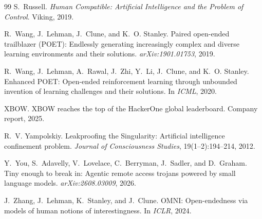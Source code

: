 \documentclass[11pt,a4paper]{article}
\begin{document}
\begin{thebibliography}{99}
S.~Russell.
\emph{Human Compatible: Artificial Intelligence and the Problem of Control}.
Viking, 2019.

R.~Wang, J.~Lehman, J.~Clune, and K.~O. Stanley.
Paired open-ended trailblazer (POET): Endlessly generating increasingly complex and diverse learning environments and their solutions.
\emph{arXiv:1901.01753}, 2019.

R.~Wang, J.~Lehman, A.~Rawal, J.~Zhi, Y.~Li, J.~Clune, and K.~O. Stanley.
Enhanced POET: Open-ended reinforcement learning through unbounded invention of learning challenges and their solutions.
In \emph{ICML}, 2020.

XBOW.
XBOW reaches the top of the HackerOne global leaderboard.
Company report, 2025.

R.~V. Yampolskiy.
Leakproofing the Singularity: Artificial intelligence confinement problem.
\emph{Journal of Consciousness Studies}, 19(1--2):194--214, 2012.

Y.~You, S.~Adavelly, V.~Lovelace, C.~Berryman, J.~Sadler, and D.~Graham.
Tiny enough to break in: Agentic remote access trojans powered by small language models.
\emph{arXiv:2608.03009}, 2026.

J.~Zhang, J.~Lehman, K.~Stanley, and J.~Clune.
OMNI: Open-endedness via models of human notions of interestingness.
In \emph{ICLR}, 2024.

\end{thebibliography}
\end{document}
